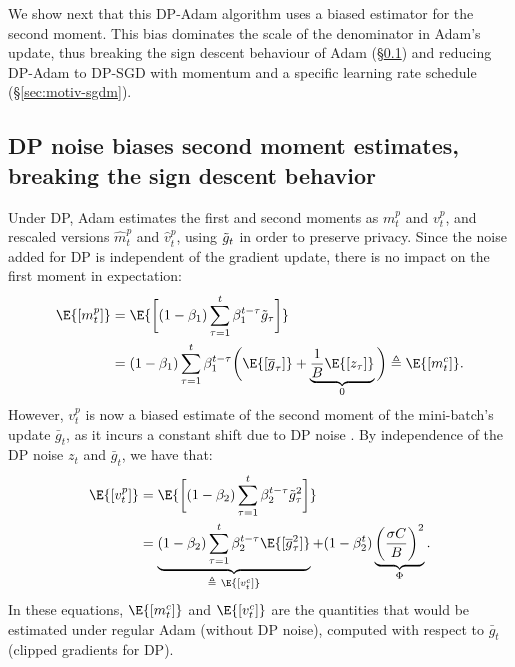 \documentclass[letterpaper]{article} %
\begin{document}
We show next that this DP-Adam algorithm uses a biased estimator for the second moment. This bias dominates the scale of the denominator in Adam's update, thus breaking the sign descent behaviour of Adam (\S\ref{sec:motiv-bias}) and reducing DP-Adam to DP-SGD with momentum and a specific learning rate schedule (\S\ref{sec:motiv-sgdm}).

\subsection{DP noise biases second moment estimates, breaking the sign descent behavior}
\label{sec:motiv-bias}
Under DP, Adam estimates the first and second moments as $m_t^{p}$ and $v_t^{p}$, and rescaled versions $\hat{m}_t^{p}$ and $\hat{v}_t^{p}$, using $\Tilde{g}_t$ in order to preserve privacy. Since the noise added for DP is independent of the gradient update, there is no impact on the first moment in expectation:
\begin{align}
\label{eq:mt}
\begin{split}
    \E{[m_t^{p}]} &= \E{\bigg[ (1-\beta_{1}) \sum_{\tau=1}^{t} \beta_{1}^{t-\tau} \Tilde{g}_\tau \bigg]} \\
    &= (1-\beta_{1}) \sum_{\tau=1}^{t} \beta_{1}^{t-\tau} \bigg( \E{[ \overline{g}_\tau ]} +  \underbrace{\frac{1}{B}\E{[z_\tau]}}_{\text{0}} \bigg) \triangleq \E{[m_t^{c}]}.
\end{split}
\end{align}
However, $v_t^{p}$ is now a biased estimate of the second moment of the mini-batch's update $\bar{g}_t$, as it incurs a constant shift due to DP noise \citep{tang2023dpadam}. By independence of the DP noise $z_t$ and $\bar{g}_t$, we have that:
\begin{align}
\label{eq:vt}
\begin{split}
    \E{[v_t^{p}]} &= \E{\bigg[ (1-\beta_{2}) \sum_{\tau=1}^{t} \beta_{2}^{t-\tau} {\Tilde{g}_\tau}^{2} \bigg]} \\
    &= \underbrace{(1-\beta_{2}) \sum_{\tau=1}^{t} \beta_{2}^{t-\tau} \E{ [ \overline{g}_\tau^{2}]}}_{\triangleq \ \E{[v_t^{c}]}} + (1-\beta_{2}^{t})\underbrace{\bigg(\frac{\sigma C}{B} \bigg)^{2}}_{\Phi} .
\end{split}
\end{align}
In these equations, $\E{[m_t^{c}]}$ and $\E{[v_t^{c}]}$ are the quantities that would be estimated under regular Adam (without DP noise), computed with respect to $\bar{g}_t$ (clipped gradients for DP).
\end{document}
